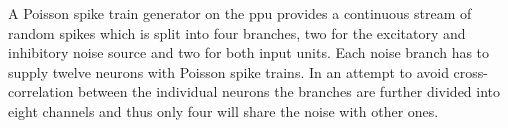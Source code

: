 A Poisson spike train generator on the \gls{ppu} provides a continuous stream of random spikes which is split into four branches, two for the excitatory and inhibitory noise source and two for both input units. Each noise branch has to supply twelve neurons with Poisson spike trains. In an attempt to avoid cross-correlation between the individual neurons the branches are further divided into eight channels and thus only four will share the noise with other ones.


